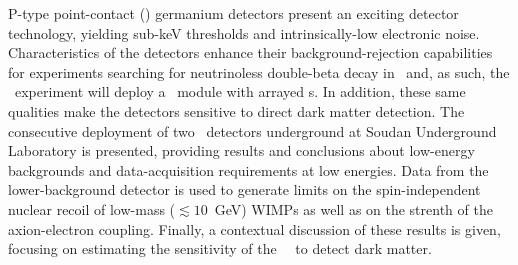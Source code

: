 P-type point-contact (\ppc) germanium detectors present an exciting detector technology,
yielding sub-keV thresholds and intrinsically-low electronic noise.  Characteristics of
the detectors enhance their background-rejection capabilities for experiments searching
for neutrinoless double-beta decay in \gersevensix~and, as such, the \MJ~experiment will 
deploy a \minmod~module with arrayed {\ppc}s.  In addition, these same
qualities make the detectors sensitive to direct dark matter detection.  The consecutive 
deployment of two \ppc~detectors underground at Soudan Underground Laboratory is presented, providing
results and conclusions about low-energy backgrounds and data-acquisition requirements at low energies. 
Data from the lower-background detector is used to generate limits on 
the spin-independent nuclear recoil of low-mass ($\lesssim10$~GeV) WIMPs as well as on 
the strenth of the axion-electron coupling.  Finally, a contextual discussion
of these results is given, focusing on estimating the sensitivity of the 
\MJ~\minmod~to detect dark matter.
